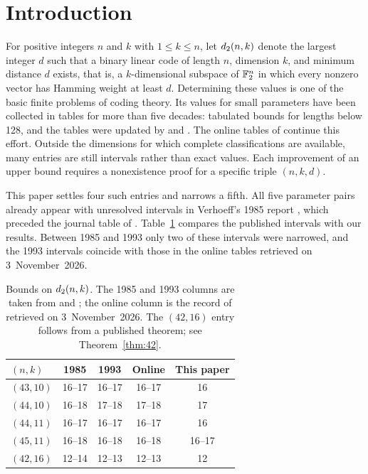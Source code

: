 \section{Introduction}
For positive integers $n$ and $k$ with $1\le k\le n$, let $d_2(n,k)$ denote the largest integer $d$ such that a binary linear code of length $n$, dimension $k$, and minimum distance $d$ exists, that is, a $k$-dimensional subspace of $\mathbb F_2^n$ in which every nonzero vector has Hamming weight at least $d$. Determining these values is one of the basic finite problems of coding theory. Its values for small parameters have been collected in tables for more than five decades: \citet{helgert1973} tabulated bounds for lengths below 128, and the tables were updated by \citet{verhoeff1987} and \citet{brouwer1993}. The online tables of \citet{grasslTables} continue this effort. Outside the dimensions for which complete classifications are available, many entries are still intervals rather than exact values. Each improvement of an upper bound requires a nonexistence proof for a specific triple $(n,k,d)$.

This paper settles four such entries and narrows a fifth. All five parameter pairs already appear with unresolved intervals in Verhoeff's 1985 report \citep{verhoeff1985}, which preceded the journal table of \citet{verhoeff1987}. Table~\ref{tab:history} compares the published intervals with our results. Between 1985 and 1993 only two of these intervals were narrowed, and the 1993 intervals coincide with those in the online tables retrieved on 3~November~2026.

\begin{table}[t]
\caption{Bounds on $d_2(n,k)$. The 1985 and 1993 columns are taken from \citet[Appendix~I]{verhoeff1985} and \citet[Table~I]{brouwer1993}; the online column is the record of \citet{grasslTables} retrieved on 3~November~2026. The $(42,16)$ entry follows from a published theorem; see Theorem~\ref{thm:42}.}
\label{tab:history}
\centering\small
\begin{tabular}{@{}lcccc@{}}
\toprule
$(n,k)$ & 1985 & 1993 & Online & This paper\\
\midrule
$(43,10)$ & 16--17 & 16--17 & 16--17 & 16\\
$(44,10)$ & 16--18 & 17--18 & 17--18 & 17\\
$(44,11)$ & 16--17 & 16--17 & 16--17 & 16\\
$(45,11)$ & 16--18 & 16--18 & 16--18 & 16--17\\
$(42,16)$ & 12--14 & 12--13 & 12--13 & 12\\
\bottomrule
\end{tabular}
\end{table}

